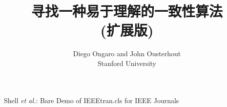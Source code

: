 \documentclass[journal]{IEEEtran}
\begin{document}
%
\title{寻找一种易于理解的一致性算法\\(扩展版)}
%
%
%

\author{Diego Ongaro and John Ousterhout \\ Stanford University}

% 
%



 {Shell \MakeLowercase{\textit{et al.}}: Bare Demo of IEEEtran.cls for IEEE Journals}
% 
\end{document}
